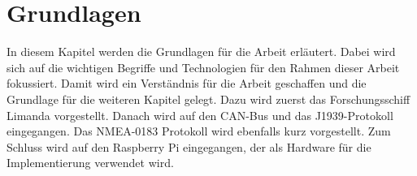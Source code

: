 \chapter{Grundlagen}


In diesem Kapitel werden die Grundlagen für die Arbeit erläutert.
Dabei wird sich auf die wichtigen Begriffe und Technologien für den Rahmen dieser Arbeit fokussiert.
Damit wird ein Verständnis für die Arbeit geschaffen und die Grundlage für die weiteren Kapitel gelegt.
Dazu wird zuerst das Forschungsschiff Limanda vorgestellt. Danach wird auf den CAN-Bus und das J1939-Protokoll eingegangen.
Das NMEA-0183 Protokoll wird ebenfalls kurz vorgestellt. Zum Schluss wird auf den Raspberry Pi eingegangen,
der als Hardware für die Implementierung verwendet wird.

